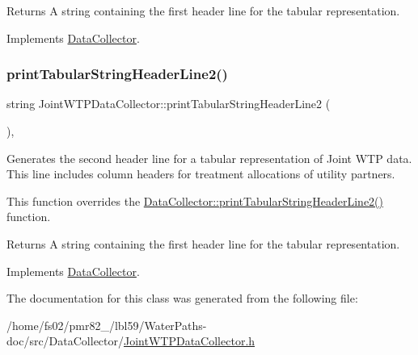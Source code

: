 \begin{DoxyReturn}{Returns}
A string containing the first header line for the tabular representation. 
\end{DoxyReturn}


Implements \mbox{\hyperlink{classDataCollector_a91619cfa9e9b8cefd2f7c20d5718b41e}{Data\+Collector}}.

\mbox{\label{classJointWTPDataCollector_ab5828bc2dec423f812b5591ea42e9972}} 
\subsubsection{\texorpdfstring{print\+Tabular\+String\+Header\+Line2()}{printTabularStringHeaderLine2()}}
{\footnotesize\ttfamily string Joint\+W\+T\+P\+Data\+Collector\+::print\+Tabular\+String\+Header\+Line2 (\begin{DoxyParamCaption}{ }\end{DoxyParamCaption})\hspace{0.3cm}{\ttfamily [override]}, {\ttfamily [virtual]}}



Generates the second header line for a tabular representation of Joint W\+TP data. This line includes column headers for treatment allocations of utility partners. 

This function overrides the \mbox{\hyperlink{classDataCollector_af01ea961314be2164f39e6d4cd59e443}{Data\+Collector\+::print\+Tabular\+String\+Header\+Line2()}} function.

\begin{DoxyReturn}{Returns}
A string containing the first header line for the tabular representation. 
\end{DoxyReturn}


Implements \mbox{\hyperlink{classDataCollector_af01ea961314be2164f39e6d4cd59e443}{Data\+Collector}}.



The documentation for this class was generated from the following file\+:\begin{DoxyCompactItemize}
\item 
/home/fs02/pmr82\+\_/lbl59/\+Water\+Paths-\/doc/src/\+Data\+Collector/\mbox{\hyperlink{JointWTPDataCollector_8h}{Joint\+W\+T\+P\+Data\+Collector.\+h}}\end{DoxyCompactItemize}
